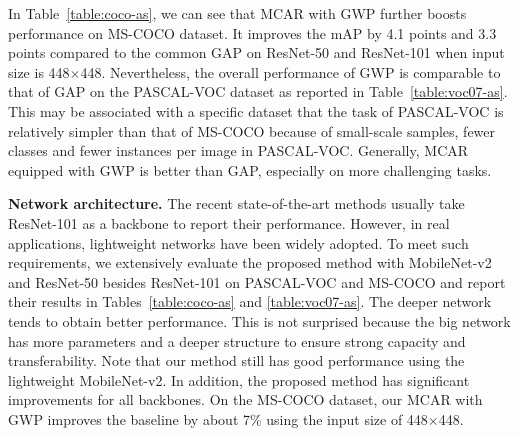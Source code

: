\documentclass[journal]{IEEEtran}
\begin{document}
In Table~\ref{table:coco-as}, we can see that MCAR with GWP further boosts performance on MS-COCO dataset. It improves the mAP by 4.1 points and 3.3 points compared to the common GAP on ResNet-50 and ResNet-101 when input size is 448$\times$448.  Nevertheless, the overall performance of GWP is comparable to that of GAP on the PASCAL-VOC dataset as reported in Table~\ref{table:voc07-as}. This may be associated with a specific dataset that the task of PASCAL-VOC is relatively simpler than that of MS-COCO because of small-scale samples, fewer classes and fewer instances per image in PASCAL-VOC. Generally, MCAR equipped with GWP is better than GAP, especially on more challenging tasks.

\noindent \textbf{Network architecture.} The recent state-of-the-art methods usually take ResNet-101 as a backbone to report their performance. However, in real applications, lightweight networks have been widely adopted. To meet such requirements, we extensively evaluate the proposed method with MobileNet-v2 and ResNet-50 besides ResNet-101 on PASCAL-VOC and MS-COCO and report their results in Tables~\ref{table:coco-as} and \ref{table:voc07-as}. The deeper network tends to obtain better performance. This is not surprised because the big network has more parameters and a deeper structure to ensure strong capacity and transferability. Note that our method still has good performance using the lightweight MobileNet-v2. In addition, the proposed method has significant improvements for all backbones. On the MS-COCO dataset, our MCAR with GWP improves the baseline by about 7\% using the input size of 448$\times$448.  
\end{document}
